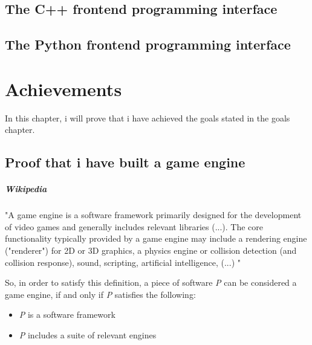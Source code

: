     \section{The C++    frontend programming interface}
    \section{The Python frontend programming interface}
    
\chapter{Achievements}

    In this chapter, i will prove that i have achieved the goals stated in the goals chapter.

    \section{Proof that i have built a game engine}
        \paragraph*{Wikipedia} "A game engine is a software framework primarily designed for the development of video games and generally includes relevant libraries
        (...).
        The core functionality typically provided by a game engine may include a rendering engine ("renderer") for 2D or 3D graphics, a physics engine or collision detection (and collision response), sound, scripting, artificial intelligence, 
        (...)
        "

        So, in order to satisfy this definition, a piece of software \emph{P} can be considered a game engine, if and only if \emph{P} satisfies the following:

        \begin{itemize}
            \item \emph{P} is a software framework
            \item \emph{P} includes a suite of relevant engines
        \end{itemize}

